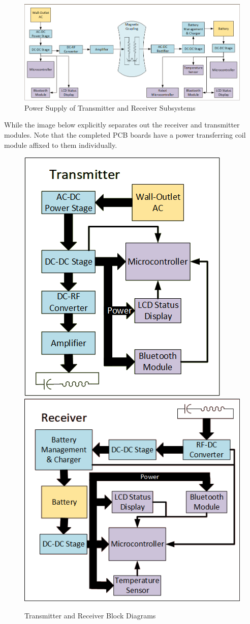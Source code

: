 \documentclass[12pt]{article}
\begin{document}
\begin{figure}[h!]
\includegraphics[width=0.92\linewidth]{power_supply_diagram}
\caption{Power Supply of Transmitter and Receiver Subsystems}
\end{figure}
\indent
While the image below explicitly separates out the receiver and transmitter modules.  Note that the completed PCB boards have a power transferring coil module affixed to them individually.
\begin{figure}[h!]
\centering
\includegraphics[width=0.41\linewidth]{transmitter_diagram.png}
\includegraphics[width=0.532\linewidth]{receiver_diagram.png}
\caption{Transmitter and Receiver Block Diagrams}
\end{figure}
\hfill \\
\end{document}

